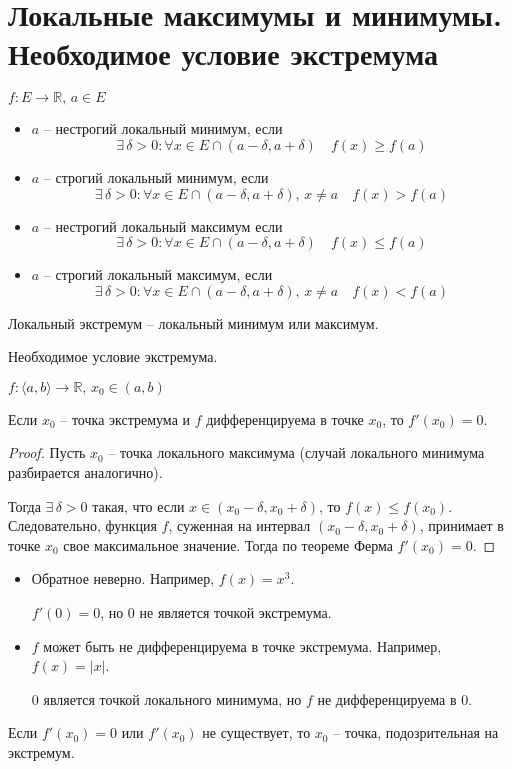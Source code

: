 \section{Локальные максимумы и минимумы. Необходимое условие экстремума}
\begin{conj}
    $f: E \to \mathbb{R}, \, a \in E$
    \begin{itemize}
        \item $a$ -- нестрогий локальный минимум, если
        \[ \exists \, \delta > 0 : \forall x \in E \cap (a - \delta, a + \delta) \quad f(x) \geqslant f(a) \]
        \item $a$ -- строгий локальный минимум, если
        \[ \exists \, \delta > 0 : \forall x \in E \cap (a - \delta, a + \delta), \, x \neq a \quad f(x) > f(a) \]
        \item $a$ -- нестрогий локальный максимум если
        \[ \exists \, \delta > 0 : \forall x \in E \cap (a - \delta, a + \delta) \quad f(x) \leqslant f(a) \]
        \item $a$ -- строгий локальный максимум, если
        \[ \exists \, \delta > 0 : \forall x \in E \cap (a - \delta, a + \delta), \, x \neq a \quad f(x) < f(a) \]
    \end{itemize}
    Локальный экстремум -- локальный минимум или максимум.
\end{conj}

\begin{theorem-non}
    Необходимое условие экстремума.

    $f: \langle a, b \rangle \to \mathbb{R}, \, x_0 \in (a, b)$

    Если $x_0$ -- точка экстремума и $f$ дифференцируема в точке $x_0$, то $f'(x_0) = 0$.
\end{theorem-non}

\begin{proof}
    Пусть $x_0$ -- точка локального максимума (случай локального минимума разбирается аналогично).

    Тогда $\exists \, \delta > 0$ такая, что если $x \in (x_0 - \delta, x_0 + \delta)$, то $f(x) \leqslant f(x_0)$.
    Следовательно, функция $f$, суженная на интервал $(x_0 - \delta, x_0 + \delta)$, принимает в точке $x_0$ свое максимальное значение. 
    Тогда по теореме Ферма $f'(x_0) = 0$. 
\end{proof}

\begin{notice}
    \begin{itemize}
        \item Обратное неверно. 
        Например, $f(x) = x^3$.
    
        $f'(0) = 0$, но 0 не является точкой экстремума.
        \item $f$ может быть не дифференцируема в точке экстремума.
        Например, $f(x) = |x|$.

        0 является точкой локального минимума, но $f$ не дифференцируема в 0.
    \end{itemize}
\end{notice}

Если $f'(x_0) = 0$ или $f'(x_0)$ не существует, то $x_0$ -- точка, подозрительная на экстремум.
